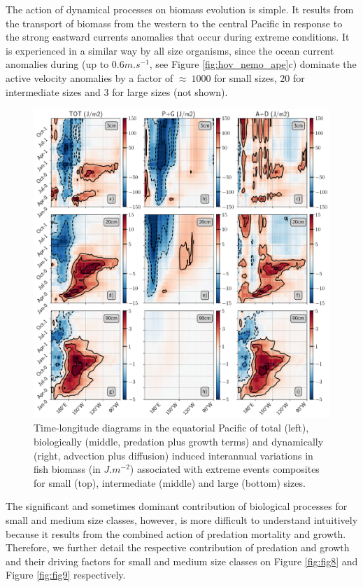 The action of dynamical processes on biomass evolution is simple. It results from the transport of biomass from the western to the central Pacific in response to the strong eastward currents anomalies that occur during extreme \nino{} conditions. It is experienced in a similar way by all size organisms, since the ocean current anomalies during \nino{} (up to $0.6 m.s^{-1}$, see Figure \ref{fig:hov_nemo_ape}c) dominate the active velocity anomalies by a factor of $\approx\ 1000$ for small sizes, $20$ for intermediate sizes and $3$ for large sizes (not shown). 

\begin{figure}[h!tp]
	\centering
	\includegraphics[scale=0.4]{figs/fig7.png}	
	\caption{Time-longitude diagrams in the equatorial Pacific of total (left), biologically (middle, predation plus growth terms) and dynamically (right, advection plus diffusion) induced interannual variations in fish biomass (in $J.m^{-2}$) associated with extreme \nino{} events composites for small (top), intermediate (middle) and large (bottom) sizes.}
	\label{fig:fig7}
\end{figure}

The significant and sometimes dominant contribution of biological processes for small and medium size classes, however, is more difficult to understand intuitively because it results from the combined action of predation mortality and growth. Therefore, we further detail the respective contribution of predation and growth and their driving factors for small and medium size classes on Figure \ref{fig:fig8} and Figure \ref{fig:fig9} respectively.


